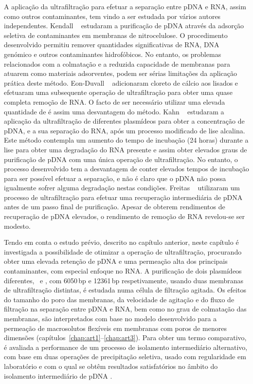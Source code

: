 A aplicação da ultrafiltração para efetuar a separação entre pDNA e RNA, assim como outros contaminantes, tem vindo a ser estudada por vários autores independentes. Kendall \et\ \cite{kendall} estudaram a purificação de pDNA através da adsorção seletiva de contaminantes em membranas de nitrocelulose.
%
O procedimento desenvolvido permitiu remover quantidades significativas de RNA, DNA genómico e outros contaminantes hidrofóbicos.
%
No entanto, os problemas relacionados com a colmatação e a reduzida capacidade de membranas para atuarem como materiais adsorventes, podem ser sérias limitações da aplicação prática deste método. Eon-Duvall \et\ \cite{duvaltff} adicionaram cloreto de cálcio aos lisados e efetuaram uma subsequente operação de ultrafiltração para obter uma quase completa remoção de RNA.
%
O facto de ser necessário utilizar uma elevada quantidade de  é assim uma desvantagem do método. Kahn \et\ \cite{kahn} estudaram a aplicação da ultrafiltração de diferentes plasmídeos para obter a concentração de pDNA, e a sua separação do RNA, após um processo modificado de lise alcalina.
%
Este método contempla um aumento do tempo de incubação (24 horas) durante a lise para obter uma degradação do RNA presente e assim obter elevados graus de purificação de pDNA com uma única operação de ultrafiltração. No entanto, o processo desenvolvido tem a desvantagem de conter elevados tempos de incubação para ser possível efetuar a separação, e não é claro que o pDNA não possa igualmente sofrer alguma degradação nestas condições. Freitas \et\ \cite{freitas} utilizaram um processo de ultrafiltração para efetuar uma recuperação intermediária de pDNA antes de um passo final de purificação. Apesar de obterem rendimentos de recuperação de pDNA elevados, o rendimento de remoção de RNA revelou-se ser modesto. 

Tendo em conta o estudo prévio, descrito no capítulo anterior, neste capítulo é investigada a possibilidade de otimizar a operação de ultrafiltração, procurando obter uma elevada retenção de pDNA e uma permeação alta dos principais contaminantes, com especial enfoque no RNA. A purificação de dois plasmídeos diferentes, \pVAX\ e \pCAMBIA, com 6050\,bp e 12361\,bp respetivamente, usando duas membranas de ultrafiltração distintas, é estudada numa célula de filtração agitada.
%
%
Os efeitos do tamanho do poro das membranas, da velocidade de agitação e do fluxo de filtração na separação entre pDNA e RNA, bem como no grau de colmatação das membranas, são interpretados com base no modelo desenvolvido para a permeação de macrosolutos flexíveis em membranas com poros de menores dimensões (capítulos~\ref{chap:art1}--\ref{chap:art3}). Para obter um termo comparativo, é avaliada a performance de um processo de isolamento intermediário alternativo, com base em duas operações de precipitação seletiva, usado com regularidade em laboratório e com o qual se obtêm resultados satisfatórios no âmbito do isolamento intermediário de pDNA \cite{sousabab,freitas}. 

